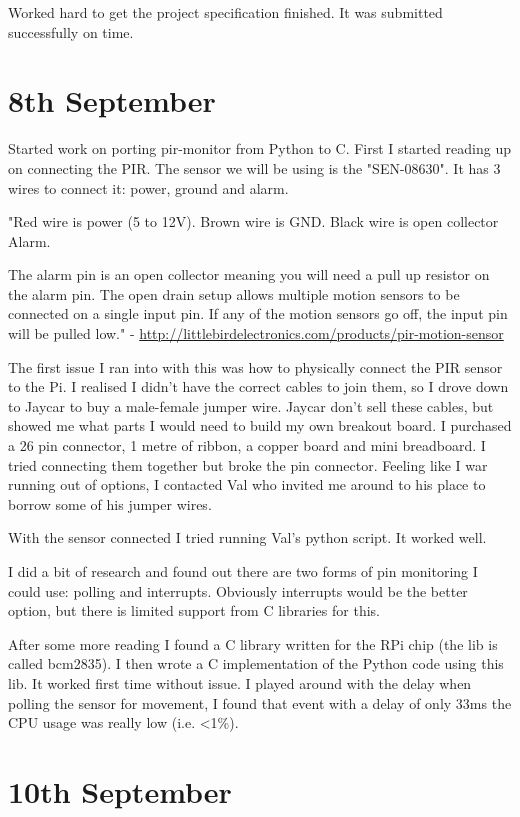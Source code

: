 Worked hard to get the project specification finished. It was submitted successfully on time.


\section*{8th September}

Started work on porting pir-monitor from Python to C. First I started reading up on connecting the PIR. The sensor we will be using is the "SEN-08630". It has 3 wires to connect it: power, ground and alarm.

"Red wire is power (5 to 12V). Brown wire is GND. Black wire is open collector Alarm.

The alarm pin is an open collector meaning you will need a pull up resistor on the alarm pin. The open drain setup allows multiple motion sensors to be connected on a single input pin. If any of the motion sensors go off, the input pin will be pulled low." - \url{http://littlebirdelectronics.com/products/pir-motion-sensor}

The first issue I ran into with this was how to physically connect the PIR sensor to the Pi. I realised I didn't have the correct cables to join them, so I drove down to Jaycar to buy a male-female jumper wire. Jaycar don't sell these cables, but showed me what parts I would need to build my own breakout board. I purchased a 26 pin connector, 1 metre of ribbon, a copper board and mini breadboard. I tried connecting them together but broke the pin connector. Feeling like I war running out of options, I contacted Val who invited me around to his place to borrow some of his jumper wires.

With the sensor connected I tried running Val's python script. It worked well.

I did a bit of research and found out there are two forms of pin monitoring I could use: polling and interrupts. Obviously interrupts would be the better option, but there is limited support from C libraries for this.

After some more reading I found a C library written for the RPi chip (the lib is called bcm2835). I then wrote a C implementation of the Python code using this lib. It worked first time without issue. I played around with the delay when polling the sensor for movement, I found that event with a delay of only 33ms the CPU usage was really low (i.e. <1\%).




\section*{10th September}

